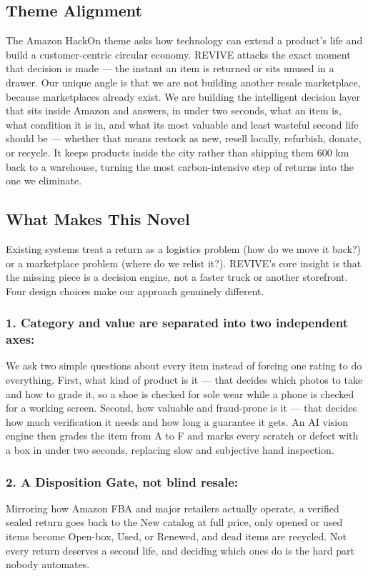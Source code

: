 \documentclass[11pt]{article}
\newcommand{\placeholder}[1]{{\color{placeGray} #1}}
\begin{document}
\subsection{Theme Alignment}
\placeholder{The Amazon HackOn theme asks how technology can extend a product's life and build a customer-centric circular economy. REVIVE attacks the exact moment that decision is made --- the instant an item is returned or sits unused in a drawer. Our unique angle is that we are not building another resale marketplace, because marketplaces already exist. We are building the intelligent decision layer that sits inside Amazon and answers, in under two seconds, what an item is, what condition it is in, and what its most valuable and least wasteful second life should be --- whether that means restock as new, resell locally, refurbish, donate, or recycle. It keeps products inside the city rather than shipping them 600 km back to a warehouse, turning the most carbon-intensive step of returns into the one we eliminate.}

\subsection{What Makes This Novel}

\placeholder{Existing systems treat a return as a logistics problem (how do we move it back?) or a marketplace problem (where do we relist it?). REVIVE's core insight is that the missing piece is a decision engine, not a faster truck or another storefront. Four design choices make our approach genuinely different.}

\subsubsection*{\color{amznSlate} 1. Category and value are separated into two independent axes:}
\placeholder{We ask two simple questions about every item instead of forcing one rating to do everything. First, what kind of product is it --- that decides which photos to take and how to grade it, so a shoe is checked for sole wear while a phone is checked for a working screen. Second, how valuable and fraud-prone is it --- that decides how much verification it needs and how long a guarantee it gets. An AI vision engine then grades the item from A to F and marks every scratch or defect with a box in under two seconds, replacing slow and subjective hand inspection.}

\subsubsection*{\color{amznSlate} 2. A Disposition Gate, not blind resale:}
\placeholder{Mirroring how Amazon FBA and major retailers actually operate, a verified sealed return goes back to the New catalog at full price, only opened or used items become Open-box, Used, or Renewed, and dead items are recycled. Not every return deserves a second life, and deciding which ones do is the hard part nobody automates.}
\end{document}

